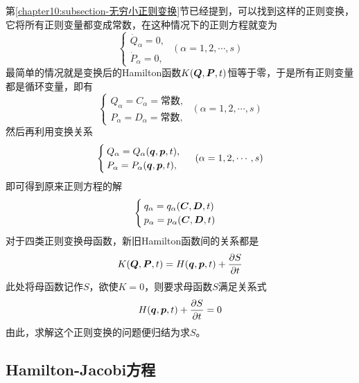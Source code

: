 第\ref{chapter10:subsection-无穷小正则变换}节已经提到，可以找到这样的正则变换，它将所有正则变量都变成常数，在这种情况下的正则方程就变为
\begin{equation}
	\begin{cases}
		\dot{Q}_\alpha = 0, \\
		\dot{P}_\alpha = 0,
	\end{cases}\,\, (\alpha = 1,2,\cdots,s)
\end{equation}
最简单的情况就是变换后的Hamilton函数$K(\boldsymbol{Q},\boldsymbol{P},t)$恒等于零，于是所有正则变量都是循环变量，即有
\begin{equation}
	\begin{cases}
		Q_\alpha = C_\alpha = \text{常数}, \\
		P_\alpha = D_\alpha = \text{常数},
	\end{cases}\,\, (\alpha=1,2,\cdots,s)
\end{equation}
然后再利用变换关系
\begin{equation}
	\begin{cases}
		Q_\alpha = Q_\alpha(\boldsymbol{q},\boldsymbol{p},t), \\
		P_\alpha = P_\alpha(\boldsymbol{q},\boldsymbol{p},t),
	\end{cases}\,\, (\alpha = 1,2,\cdots,s)
\end{equation}
即可得到原来正则方程的解
\begin{equation}
	\begin{cases}
		q_\alpha = q_\alpha(\boldsymbol{C},\boldsymbol{D},t) \\
		p_\alpha = p_\alpha(\boldsymbol{C},\boldsymbol{D},t)
	\end{cases}
\end{equation}
对于四类正则变换母函数，新旧Hamilton函数间的关系都是
\begin{equation}
	K(\boldsymbol{Q},\boldsymbol{P},t) = H(\boldsymbol{q},\boldsymbol{p},t) + \frac{\partial S}{\partial t}
\end{equation}
此处将母函数记作$S$，欲使$K = 0$，则要求母函数$S$满足关系式
\begin{equation}
	H(\boldsymbol{q},\boldsymbol{p},t) + \frac{\partial S}{\partial t} = 0
\end{equation}
由此，求解这个正则变换的问题便归结为求$S$。

\subsection{Hamilton-Jacobi方程}

